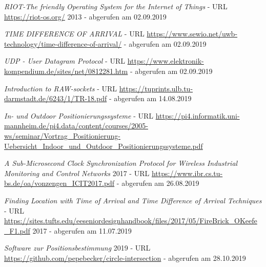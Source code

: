 \begin{thebibliography}{}
	\textit{RIOT-The friendly Operating System for the Internet of Things} - URL \url{https://riot-os.org/} 2013 - abgerufen am 02.09.2019	


	\textit{TIME DIFFERENCE OF ARRIVAL} - URL \url{https://www.sewio.net/uwb-technology/time-difference-of-arrival/} - abgerufen am 02.09.2019	


	\textit{UDP - User Datagram Protocol} - URL \url{https://www.elektronik-kompendium.de/sites/net/0812281.htm} - abgerufen am 02.09.2019	

	\textit{Introduction to RAW-sockets} - URL \url{https://tuprints.ulb.tu-darmstadt.de/6243/1/TR-18.pdf} - abgerufen am 14.08.2019	

	\textit{In- und Outdoor
Positionierungssysteme} - URL \url{https://pi4.informatik.uni-mannheim.de/pi4.data/content/courses/2005-ws/seminar/Vortrag_Positionierung-Uebersicht_Indoor_und_Outdoor_Positionierungssysteme.pdf} 

	\textit{A Sub-Microsecond Clock Synchronization Protocol for Wireless Industrial Monitoring and Control Networks} 2017 - URL \url{https://www.ibr.cs.tu-bs.de/oa/vonzengen_ICIT2017.pdf} - abgerufen am 26.08.2019

 
	\textit{Finding Location with Time of Arrival and Time Difference of Arrival Techniques} - URL \url{https://sites.tufts.edu/eeseniordesignhandbook/files/2017/05/FireBrick_OKeefe_F1.pdf} 2017 - abgerufen am 11.07.2019	
	


	\textit{Software zur Positionsbestimmung} 2019 - URL \url{https://github.com/pepebecker/circle-intersection} - abgerufen am 28.10.2019	
	
	
	
	
	
	
	
	
	
	
	
	
	
\end{thebibliography}
